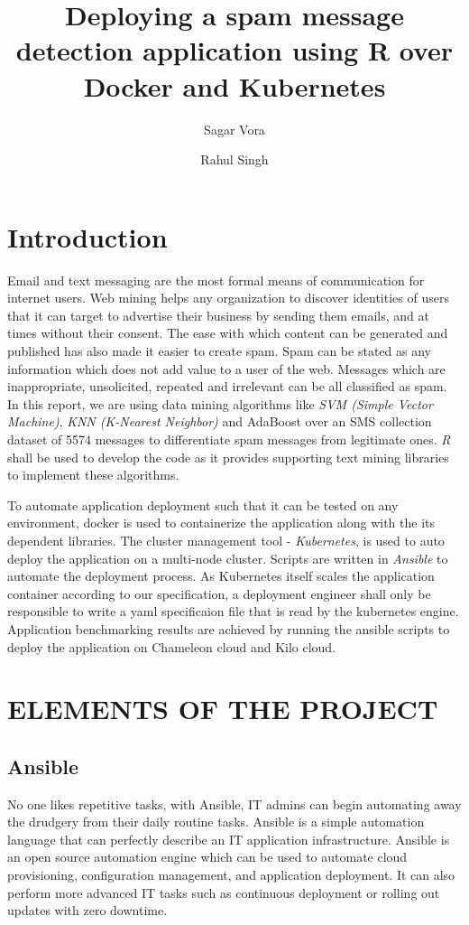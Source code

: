 \documentclass[9pt,twocolumn,twoside]{../../styles/osajnl}
\title{Deploying a spam message detection application using R over Docker and Kubernetes}
\author[1,*]{Sagar Vora}
\author[1]{Rahul Singh}
\affil[1]{School of Informatics and Computing, Bloomington, IN 47408, U.S.A.}
\affil[*]{Corresponding authors: vorasagar7@gmail.com, rahul\textunderscore singh919@yahoo.com}
\begin{document}
\maketitle

\section{Introduction}

Email and text messaging are the most formal means of communication
for internet users. Web mining helps any organization to discover
identities of users that it can target to advertise their business by
sending them emails, and at times without their consent. The ease with
which content can be generated and published has also made it easier
to create spam. Spam can be stated as any information which does not
add value to a user of the web. Messages which are inappropriate,
unsolicited, repeated and irrelevant can be all classified as spam. In
this report, we are using data mining algorithms like \emph{SVM
  (Simple Vector Machine)}, \emph{KNN (K-Nearest Neighbor)} and
AdaBoost over an SMS collection dataset of 5574 messages to
differentiate spam messages from legitimate ones. \emph{R} shall be
used to develop the code as it provides supporting text mining
libraries to implement these algorithms.

\noindent

To automate application deployment such that it can be tested on any
environment, docker is used to containerize the application along with
the its dependent libraries. The cluster management tool -
\emph{Kubernetes}, is used to auto deploy the application on a
multi-node cluster. Scripts are written in \emph{Ansible}
\cite{www-ansible} to automate the deployment process. As Kubernetes
itself scales the application container according to our
specification, a deployment engineer shall only be responsible to
write a yaml specificaion file that is read by the kubernetes
engine. Application benchmarking results are achieved by running the
ansible scripts to deploy the application on Chameleon cloud and Kilo
cloud.


\section{ELEMENTS OF THE PROJECT}

\subsection{Ansible}
No one likes repetitive tasks, with Ansible, IT
admins can begin automating away the drudgery from their daily routine
tasks. Ansible is a simple automation language that can perfectly
describe an IT application infrastructure. Ansible is an open source
automation engine which can be used to automate cloud provisioning,
configuration management, and application deployment. It can also
perform more advanced IT tasks such as continuous deployment or
rolling out updates with zero downtime.
\end{document}
